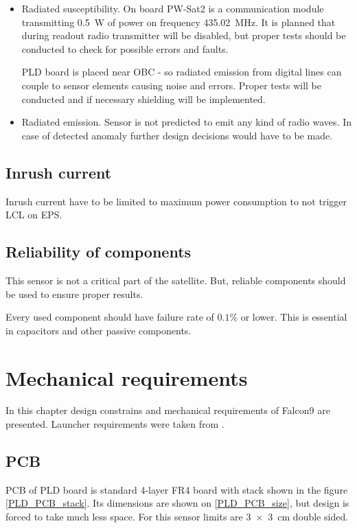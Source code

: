 \begin{itemize}
            \item Radiated susceptibility.
                On board PW-Sat2 is a communication module transmitting \SI{0.5}{\watt} of power on frequency \SI{435.02}{\mega\hertz}. It is planned that during readout radio transmitter will be disabled, but proper tests should be conducted to check for possible errors and faults.

                PLD board is placed near OBC - so radiated emission from digital lines can couple to sensor elements causing noise and errors. Proper tests will be conducted and if necessary shielding will be implemented.

            \item Radiated emission.
                Sensor is not predicted to emit any kind of radio waves. In case of detected anomaly further design decisions would have to be made.

        \end{itemize}


    \subsection{Inrush current}
        Inrush current have to be limited to maximum power consumption to not trigger LCL on EPS.

    \subsection{Reliability of components}
        This sensor is not a critical part of the satellite. But, reliable components should be used to ensure proper results.

        Every used component should have failure rate of $0.1\si{\percent}$ or lower. This is essential in capacitors and other passive components.


\section{Mechanical requirements}
    In this chapter design constrains and mechanical requirements of Falcon9 are presented. Launcher requirements were taken from \cite{Falcon9_user_manual}.

    \subsection{PCB}
    \label{PCB_description}
        PCB of PLD board is standard 4-layer FR4 board with stack shown in the figure \ref{PLD_PCB_stack}. Its dimensions are shown on \ref{PLD_PCB_size}, but design is forced to take much less space. For this sensor limits are \SI{3x3}{\centi\meter} double sided.

